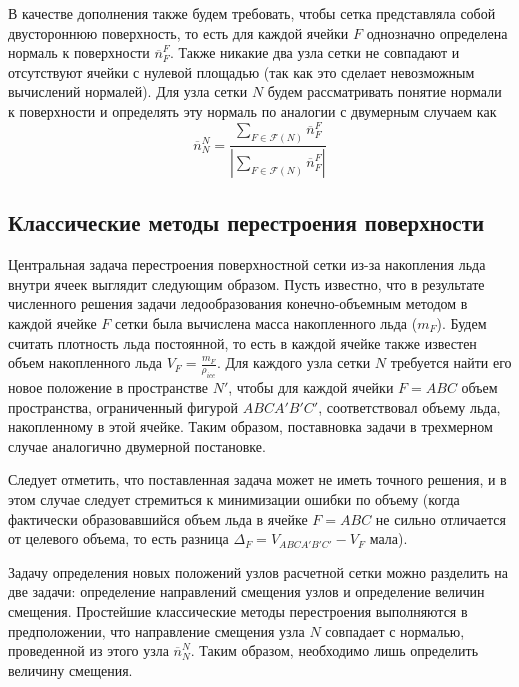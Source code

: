 В качестве дополнения также будем требовать, чтобы сетка представляла собой двустороннюю поверхность, то есть для каждой ячейки $F$ однозначно определена нормаль к поверхности $\overline{n}^F_F$.
Также никакие два узла сетки не совпадают и отсутствуют ячейки с нулевой площадью (так как это сделает невозможным вычислений нормалей).
Для узла сетки $N$ будем рассматривать понятие нормали к поверхности и определять эту нормаль по аналогии с двумерным случаем как
\begin{equation}
\overline{n}_N^N = \frac{\sum_{F \in \mathscr{F}(N)}{\overline{n}_F^F} }{ \left| \sum_{F \in \mathscr{F}(N)}{\overline{n}_F^F} \right| }
\end{equation}


\subsection{Классические методы перестроения поверхности}

Центральная задача перестроения поверхностной сетки из-за накопления льда внутри ячеек выглядит следующим образом.
Пусть известно, что в результате численного решения задачи ледообразования конечно-объемным методом \cite{Beaugendre2003Ice} в каждой ячейке $F$ сетки была вычислена масса накопленного льда ($m_F$).
Будем считать плотность льда постоянной, то есть в каждой ячейке также известен объем накопленного льда $V_F = \frac{m_F}{\rho_{ice}}$.
Для каждого узла сетки $N$ требуется найти его новое положение в пространстве $N'$, чтобы для каждой ячейки $F = ABC$ объем пространства, ограниченный фигурой $ABCA'B'C'$, соответствовал объему льда, накопленному в этой ячейке.
Таким образом, поставновка задачи в трехмерном случае аналогично двумерной постановке.

Следует отметить, что поставленная задача может не иметь точного решения, и в этом случае следует стремиться к минимизации ошибки по объему (когда фактически образовавшийся объем льда в ячейке $F = ABC$ не сильно отличается от целевого объема, то есть разница $\Delta_F = V_{ABCA'B'C'} - V_F$ мала).

Задачу определения новых положений узлов расчетной сетки можно разделить на две задачи: определение направлений смещения узлов и определение величин смещения.
Простейшие классические методы перестроения выполняются в предположении, что направление смещения узла $N$ совпадает с нормалью, проведенной из этого узла $\overline{n}_N^N$.
Таким образом, необходимо лишь определить величину смещения.

